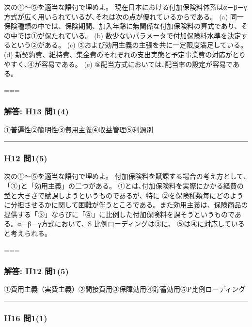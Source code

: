 \documentclass[]{article}
\begin{document}
次の①～⑤を適当な語句で埋めよ。
現在日本における付加保険料体系はα－β－γ方式が広く用いられているが､それは次の点が優れているからである。
(a)
同一保険種類の中では、保険期間、加入年齢に無関係な付加保険料の算式であり、その中では①が保たれている。
(b) 数少ないパラメータで付加保険料水準を決定するという②がある。 (c)
③および効用主義の主張を共に一定限度満足している。 (d)
新契約費、維持費、集金費のそれぞれの支出実態と予定事業費の対応がとりやすく､④が容易である。
(e) ⑤配当方式においては､配当率の設定が容易である。

===

\hypertarget{ux89e3ux7b54-h13-ux554f14}{%
\subsubsection{解答: H13 問1(4)}\label{ux89e3ux7b54-h13-ux554f14}}

①普遍性②簡明性③費用主義④収益管理⑤利源別

\begin{center}\rule{0.5\linewidth}{0.5pt}\end{center}

\hypertarget{h12-ux554f15}{%
\subsubsection{H12 問1(5)}\label{h12-ux554f15}}

次の①～⑤を適当な語句で埋めよ。
付加保険料を賦課する場合の考え方として､「①｣と「効用主義」の二つがある。
①とは､付加保険料を実際にかかる経費の型と大きさで賦課しようというものであるが、特に
②を保険種類毎にどのように分担させるかに関して困難が伴うところである。また効用主義は、保険商品の提供する「③」ならびに「④」に比例した付加保険料を課そうというものである。α－β－γ方式において、S
比例ローディングは③に、 ⑤は④に対応していると考えられる。

===

\hypertarget{ux89e3ux7b54-h12-ux554f15}{%
\subsubsection{解答: H12 問1(5)}\label{ux89e3ux7b54-h12-ux554f15}}

①費用主義（実費主義）②間接費用③保障効用④貯蓄効用⑤P比例ローディング

\begin{center}\rule{0.5\linewidth}{0.5pt}\end{center}

\hypertarget{h16-ux554f11}{%
\subsubsection{H16 問1(1)}\label{h16-ux554f11}}
\end{document}

